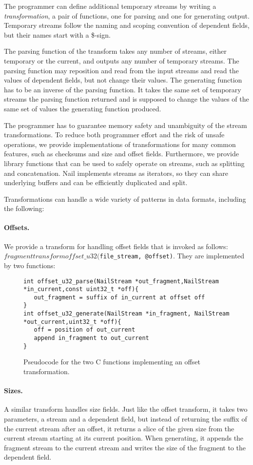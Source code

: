 The programmer can define additional temporary streams by writing a \emph{transformation}, a pair of
functions, one for parsing and one for generating output. Temporary streams follow the naming and
scoping convention of dependent fields, but their names start with a \$-sign. 

The parsing function of the transform takes any number of streams, either temporary or the current,
and outputs any number of temporary streams. The parsing function may reposition and read from the
input streams and read the values of dependent fields, but not change their values. The generating
function has to be an inverse of the parsing function. It takes the same set of temporary streams
the parsing function returned and is supposed to change the values of the same set of values the
generating function produced.

The programmer has to guarantee memory safety and unambiguity of the stream transformations. To
reduce both programmer effort and the risk of unsafe operations, we provide implementations of
transformations for many common features, such as checksums and size and offset fields. Furthermore,
we provide library functions that can be used to safely operate on streams, such as splitting and
concatenation. Nail implements streams as iterators, so they can share underlying buffers and can be
efficiently duplicated and split.

Transformations can handle a wide variety of patterns in data formats, including the following: 
\paragraph{Offsets.}
We provide a transform for handling offset fields that is invoked as follows:
\texttt{$fragment transform offset\_u32($file_stream, @offset)}. 
They are implemented by two  functions:
\begin{figure}[tb]
\begin{verbatim}
int offset_u32_parse(NailStream *out_fragment,NailStream *in_current,const uint32_t *off){
   out_fragment = suffix of in_current at offset off
}
int offset_u32_generate(NailStream *in_fragment, NailStream *out_current,uint32_t *off){
   off = position of out_current
   append in_fragment to out_current
}
\end{verbatim}
\caption{Pseudocode for the two C functions implementing an offset transformation.}
\end{figure}


\paragraph{Sizes.}
A similar transform handles size fields. Just like the offset transform, it takes two parameters, a
stream and a dependent field, but instead of returning the suffix of the current stream after an
offset, it returns a slice of the given size from the current stream starting at its current
position. When generating, it appends the fragment stream to the current stream and writes the size
of the fragment to the dependent field.

